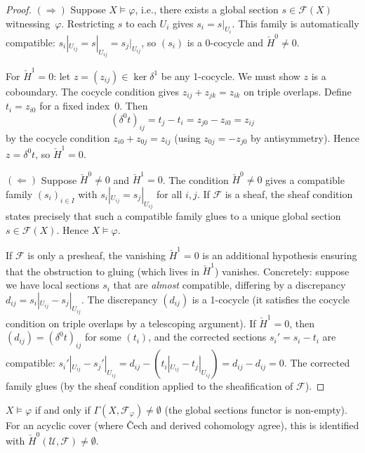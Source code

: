 \begin{proof}
$(\Rightarrow)$\; Suppose $X \models \varphi$, i.e., there exists a
global section $s \in \mathcal{F}(X)$ witnessing~$\varphi$.
Restricting $s$ to each $U_i$ gives $s_i = s|_{U_i}$.  This family
is automatically compatible:
$s_i|_{U_{ij}} = s|_{U_{ij}} = s_j|_{U_{ij}}$, so $(s_i)$ is a
0-cocycle and $\check{H}^0 \neq 0$.

For $\check{H}^1 = 0$: let $z = (z_{ij}) \in \ker \delta^1$ be any
1-cocycle.  We must show $z$ is a coboundary.  The cocycle condition
gives $z_{ij} + z_{jk} = z_{ik}$ on triple overlaps.  Define
$t_i = z_{i0}$ for a fixed index~$0$.  Then
\[
  (\delta^0 t)_{ij} = t_j - t_i = z_{j0} - z_{i0} = z_{ij}
\]
by the cocycle condition $z_{i0} + z_{0j} = z_{ij}$ (using
$z_{0j} = -z_{j0}$ by antisymmetry).  Hence $z = \delta^0 t$, so
$\check{H}^1 = 0$.

$(\Leftarrow)$\;
Suppose $\check{H}^0 \neq 0$ and $\check{H}^1 = 0$.  The condition
$\check{H}^0 \neq 0$ gives a compatible family $(s_i)_{i \in I}$
with $s_i|_{U_{ij}} = s_j|_{U_{ij}}$ for all $i, j$.  If
$\mathcal{F}$ is a sheaf, the sheaf condition states precisely that
such a compatible family glues to a unique global section
$s \in \mathcal{F}(X)$.  Hence $X \models \varphi$.

If $\mathcal{F}$ is only a presheaf, the vanishing $\check{H}^1 = 0$
is an additional hypothesis ensuring that the obstruction to gluing
(which lives in $\check{H}^1$) vanishes.  Concretely: suppose we have
local sections $s_i$ that are \emph{almost} compatible, differing by
a discrepancy $d_{ij} = s_i|_{U_{ij}} - s_j|_{U_{ij}}$.  The
discrepancy $(d_{ij})$ is a 1-cocycle (it satisfies the cocycle
condition on triple overlaps by a telescoping argument).  If
$\check{H}^1 = 0$, then $(d_{ij}) = (\delta^0 t)_{ij}$ for some
$(t_i)$, and the corrected sections $s_i' = s_i - t_i$ are
compatible: $s_i'|_{U_{ij}} - s_j'|_{U_{ij}} = d_{ij} -
(t_i|_{U_{ij}} - t_j|_{U_{ij}}) = d_{ij} - d_{ij} = 0$.
The corrected family glues (by the sheaf condition applied to the
sheafification of $\mathcal{F}$).
\end{proof}

\begin{corollary}[Verification $= H^0$]
\label{cor:verification}
$X \models \varphi$ if and only if
$\Gamma(X, \mathcal{F}_\varphi) \neq \emptyset$
(the global sections functor is non-empty).  For an acyclic cover
(where \v{C}ech and derived cohomology agree), this is identified
with $\check{H}^0(\mathcal{U}, \mathcal{F}) \neq \emptyset$.
\end{corollary}

